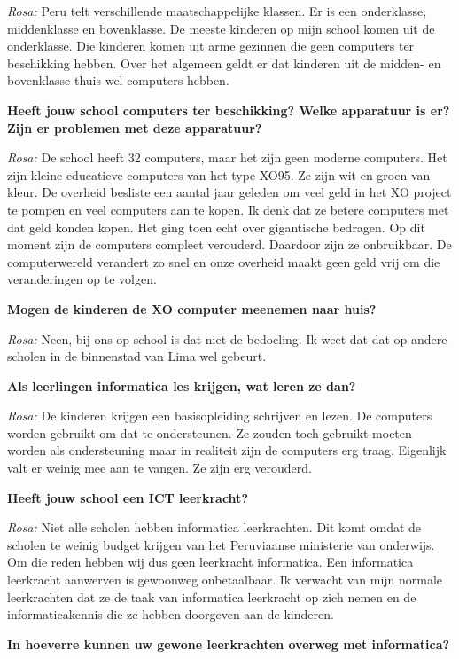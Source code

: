 \textit{Rosa:} Peru telt verschillende maatschappelijke klassen. Er is een onderklasse, middenklasse en bovenklasse. De meeste kinderen op mijn school komen uit de onderklasse. Die kinderen komen uit arme gezinnen die geen computers ter beschikking hebben. Over het algemeen geldt er dat kinderen uit de midden- en bovenklasse thuis wel computers hebben.

\textbf{Heeft jouw school computers ter beschikking? Welke apparatuur is er? Zijn er problemen met deze apparatuur?}

\textit{Rosa:} De school heeft 32 computers, maar het zijn geen moderne computers. Het zijn kleine educatieve computers van het type XO95. Ze zijn wit en groen van kleur. De overheid besliste een aantal jaar geleden om veel geld in het XO project te pompen en veel computers aan te kopen. Ik denk dat ze betere computers met dat geld konden kopen. Het ging toen echt over gigantische bedragen. Op dit moment zijn de computers compleet verouderd. Daardoor zijn ze onbruikbaar. De computerwereld verandert zo snel en onze overheid maakt geen geld vrij om die veranderingen op te volgen.

\textbf{Mogen de kinderen de XO computer meenemen naar huis?}

\textit{Rosa:} Neen, bij ons op school is dat niet de bedoeling. Ik weet dat dat op andere scholen in de binnenstad van Lima wel gebeurt.

\textbf{Als leerlingen informatica les krijgen, wat leren ze dan?}

\textit{Rosa:} De kinderen krijgen een basisopleiding schrijven en lezen. De computers worden gebruikt om dat te ondersteunen. Ze zouden toch gebruikt moeten worden als ondersteuning maar in realiteit zijn de computers erg traag. Eigenlijk valt er weinig mee aan te vangen. Ze zijn erg verouderd.

\textbf{Heeft jouw school een ICT leerkracht?}

\textit{Rosa:} Niet alle scholen hebben informatica leerkrachten. Dit komt omdat de scholen te weinig budget krijgen van het Peruviaanse ministerie van onderwijs. Om die reden hebben wij dus geen leerkracht informatica. Een informatica leerkracht aanwerven is gewoonweg onbetaalbaar. Ik verwacht van mijn normale leerkrachten dat ze de taak van informatica leerkracht op zich nemen en de informaticakennis die ze hebben doorgeven aan de kinderen.

\textbf{In hoeverre kunnen uw gewone leerkrachten overweg met informatica?}

